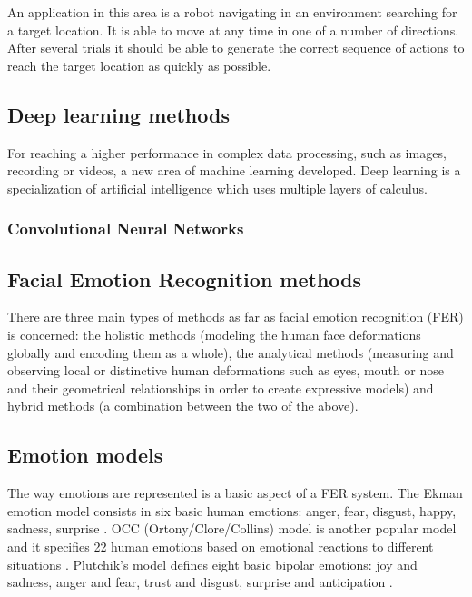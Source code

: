 \documentclass[runningheads,a4paper,12pt]{report}
\begin{document}
An application in this area is a robot navigating in an environment searching for a target location. It is able to move at any time in one of a number of directions. After several trials it should be able to generate the correct sequence of actions to reach the target location as quickly as possible.  

\subsection{Deep learning methods}
For reaching a higher performance in complex data processing, such as images, recording or videos, a new area of machine learning developed. Deep learning is a specialization of artificial intelligence which uses multiple layers of calculus. 

\subsubsection*{Convolutional Neural Networks}


\subsection{Facial Emotion Recognition methods}
There are three main types of methods as far as facial emotion recognition (FER) is concerned: the holistic methods (modeling the human face deformations globally and encoding them as a whole), the analytical methods (measuring and observing local or distinctive human deformations such as eyes, mouth or nose and their geometrical relationships in order to create expressive models) and hybrid methods (a combination between the two of the above)\cite{automatic-analysis-of-facial-expressions}. 

\subsection{Emotion models}
The way emotions are represented is a basic aspect of a FER system. The Ekman emotion model consists in six basic human emotions: anger, fear, disgust, happy, sadness, surprise \cite{basic-emotions}. OCC (Ortony/Clore/Collins) model is another popular model and it specifies 22 human emotions based on emotional reactions to different situations \cite{the-cognitive-structure-of-emotions}. Plutchik's model defines eight basic bipolar emotions: joy and sadness, anger and fear, trust and disgust, surprise and anticipation \cite{the-nature-of-emotions}.
\end{document}
